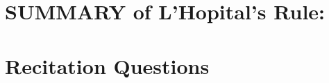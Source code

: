 \documentclass[notoc]{xourse}
\begin{document}
\part{SUMMARY of L'Hopital's Rule:}

\part{Recitation Questions}
\end{document}
